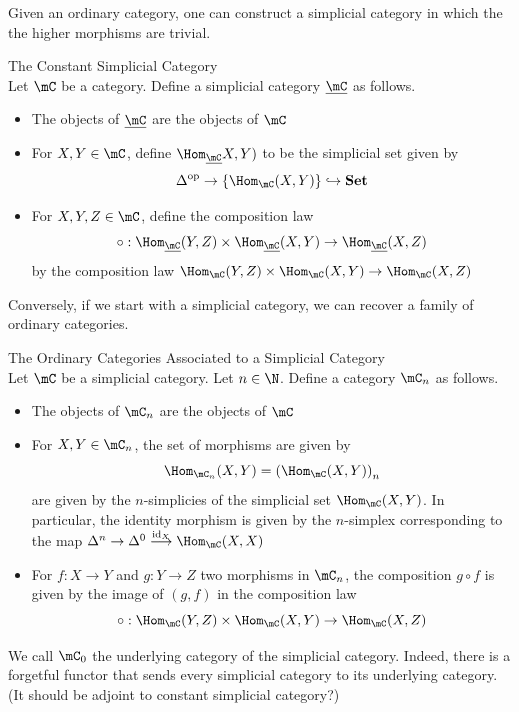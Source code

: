 \documentclass[a4paper]{article}
\begin{document}
Given an ordinary category, one can construct a simplicial category in which the the higher morphisms are trivial. 

\begin{defn}{The Constant Simplicial Category}{}\\ Let $\mC$ be a category. Define a simplicial category $\underline{\mC}$ as follows. 
\begin{itemize}
\item The objects of $\underline{\mC}$ are the objects of $\mC$
\item For $X,Y\in\mC$, define $\Hom_{\underline{\mC}}X,Y)$ to be the simplicial set given by $$\Delta^\text{op}\to\{\Hom_\mC(X,Y)\}\hookrightarrow\bold{Set}$$
\item For $X,Y,Z\in\mC$, define the composition law $$\circ:\Hom_{\underline{\mC}}(Y,Z)\times\Hom_{\underline{\mC}}(X,Y)\to\Hom_{\underline{\mC}}(X,Z)$$ by the composition law $\Hom_\mC(Y,Z)\times\Hom_\mC(X,Y)\to\Hom_\mC(X,Z)$
\end{itemize}
\end{defn}

Conversely, if we start with a simplicial category, we can recover a family of ordinary categories. 

\begin{defn}{The Ordinary Categories Associated to a Simplicial Category}{}\\ Let $\mC$ be a simplicial category. Let $n\in\N$. Define a category $\mC_n$ as follows. 
\begin{itemize}
\item The objects of $\mC_n$ are the objects of $\mC$
\item For $X,Y\in\mC_n$, the set of morphisms are given by $$\Hom_{\mC_n}(X,Y)=\left(\Hom_\mC(X,Y)\right)_n$$ are given by the $n$-simplicies of the simplicial set $\Hom_\mC(X,Y)$. In particular, the identity morphism is given by the $n$-simplex corresponding to the map $\Delta^n\to\Delta^0\overset{\text{id}_X}{\longrightarrow}\Hom_\mC(X,X)$
\item For $f:X\to Y$ and $g:Y\to Z$ two morphisms in $\mC_n$, the composition $g\circ f$ is given by the image of $(g,f)$ in the composition law $$\circ:\Hom_\mC(Y,Z)\times\Hom_\mC(X,Y)\to\Hom_\mC(X,Z)$$
\end{itemize}
\end{defn}

We call $\mC_0$ the underlying category of the simplicial category. Indeed, there is a forgetful functor that sends every simplicial category to its underlying category. (It should be adjoint to constant simplicial category?)
\end{document}
